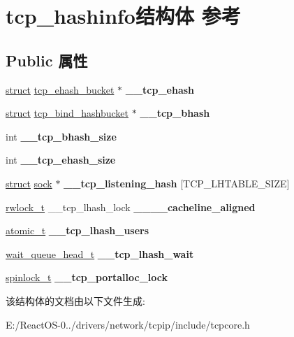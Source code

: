 \hypertarget{structtcp__hashinfo}{}\section{tcp\+\_\+hashinfo结构体 参考}
\label{structtcp__hashinfo}
\subsection*{Public 属性}
\begin{DoxyCompactItemize}
\item 
\mbox{\label{structtcp__hashinfo_a870d092960a798ebc691d009f568dc51}} 
\hyperlink{interfacestruct}{struct} \hyperlink{structtcp__ehash__bucket}{tcp\+\_\+ehash\+\_\+bucket} $\ast$ {\bfseries \+\_\+\+\_\+tcp\+\_\+ehash}
\item 
\mbox{\label{structtcp__hashinfo_aa531f7db6a831193568f6b20d0393eb9}} 
\hyperlink{interfacestruct}{struct} \hyperlink{structtcp__bind__hashbucket}{tcp\+\_\+bind\+\_\+hashbucket} $\ast$ {\bfseries \+\_\+\+\_\+tcp\+\_\+bhash}
\item 
\mbox{\label{structtcp__hashinfo_a9d17f8b873719fa954e2e0f0c30ba10d}} 
int {\bfseries \+\_\+\+\_\+tcp\+\_\+bhash\+\_\+size}
\item 
\mbox{\label{structtcp__hashinfo_ad310471a8023f66bc268873b87063d4a}} 
int {\bfseries \+\_\+\+\_\+tcp\+\_\+ehash\+\_\+size}
\item 
\mbox{\label{structtcp__hashinfo_a794aec9ec680c085b8c45ebf8b6bc6a1}} 
\hyperlink{interfacestruct}{struct} \hyperlink{structsock}{sock} $\ast$ {\bfseries \+\_\+\+\_\+tcp\+\_\+listening\+\_\+hash} \mbox{[}T\+C\+P\+\_\+\+L\+H\+T\+A\+B\+L\+E\+\_\+\+S\+I\+ZE\mbox{]}
\item 
\mbox{\label{structtcp__hashinfo_a219cb06de12cf3ab1dd52b21f799cab3}} 
\hyperlink{structrwlock__t}{rwlock\+\_\+t} \+\_\+\+\_\+tcp\+\_\+lhash\+\_\+lock {\bfseries \+\_\+\+\_\+\+\_\+\+\_\+cacheline\+\_\+aligned}
\item 
\mbox{\label{structtcp__hashinfo_a5dddf91048dffdb9ece66329157129ac}} 
\hyperlink{structatomic__t}{atomic\+\_\+t} {\bfseries \+\_\+\+\_\+tcp\+\_\+lhash\+\_\+users}
\item 
\mbox{\label{structtcp__hashinfo_a9b2fd2d8b94d14f94626ba4cc648d42d}} 
\hyperlink{struct____wait__queue__head}{wait\+\_\+queue\+\_\+head\+\_\+t} {\bfseries \+\_\+\+\_\+tcp\+\_\+lhash\+\_\+wait}
\item 
\mbox{\label{structtcp__hashinfo_adc6f1cfaedeb76838367b9ed049ca59d}} 
\hyperlink{structspinlock__t}{spinlock\+\_\+t} {\bfseries \+\_\+\+\_\+tcp\+\_\+portalloc\+\_\+lock}
\end{DoxyCompactItemize}


该结构体的文档由以下文件生成\+:\begin{DoxyCompactItemize}
\item 
E\+:/\+React\+O\+S-\/0../drivers/network/tcpip/include/tcpcore.\+h\end{DoxyCompactItemize}
